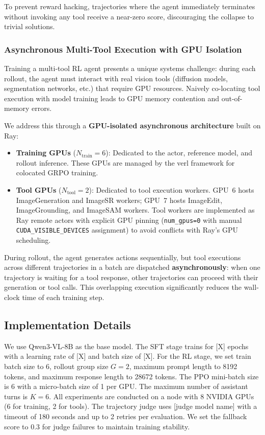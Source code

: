 \documentclass{article}
\begin{document}
To prevent reward hacking, trajectories where the agent immediately terminates without invoking any tool receive a near-zero score, discouraging the collapse to trivial solutions.

\subsubsection{Asynchronous Multi-Tool Execution with GPU Isolation}

Training a multi-tool RL agent presents a unique systems challenge: during each rollout, the agent must interact with real vision tools (diffusion models, segmentation networks, etc.) that require GPU resources. Naively co-locating tool execution with model training leads to GPU memory contention and out-of-memory errors.

We address this through a \textbf{GPU-isolated asynchronous architecture} built on Ray:

\begin{itemize}
    \item \textbf{Training GPUs} ($N_{\text{train}}=6$): Dedicated to the actor, reference model, and rollout inference. These GPUs are managed by the verl framework for colocated GRPO training.
    \item \textbf{Tool GPUs} ($N_{\text{tool}}=2$): Dedicated to tool execution workers. GPU~6 hosts ImageGeneration and ImageSR workers; GPU~7 hosts ImageEdit, ImageGrounding, and ImageSAM workers. Tool workers are implemented as Ray remote actors with explicit GPU pinning (\texttt{num\_gpus=0} with manual \texttt{CUDA\_VISIBLE\_DEVICES} assignment) to avoid conflicts with Ray's GPU scheduling.
\end{itemize}

During rollout, the agent generates actions sequentially, but tool executions across different trajectories in a batch are dispatched \textbf{asynchronously}: when one trajectory is waiting for a tool response, other trajectories can proceed with their generation or tool calls. This overlapping execution significantly reduces the wall-clock time of each training step.

\subsection{Implementation Details}

We use Qwen3-VL-8B as the base model. The SFT stage trains for [X] epochs with a learning rate of [X] and batch size of [X]. For the RL stage, we set train batch size to 6, rollout group size $G=2$, maximum prompt length to 8192 tokens, and maximum response length to 28672 tokens. The PPO mini-batch size is 6 with a micro-batch size of 1 per GPU. The maximum number of assistant turns is $K=6$. All experiments are conducted on a node with 8 NVIDIA GPUs (6 for training, 2 for tools). The trajectory judge uses [judge model name] with a timeout of 180 seconds and up to 2 retries per evaluation. We set the fallback score to 0.3 for judge failures to maintain training stability.
\end{document}
